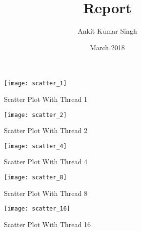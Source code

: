 \documentclass{article}
\title{Report}
\author{Ankit Kumar Singh}
\date{March 2018}
\begin{document}
\maketitle
\newpage
\begin{figure*}[!ht]
    \centering
    \texttt{[image: scatter\_1]}
    
    \caption{Scatter Plot With Thread 1}
    \label{fig:sc1}
\end{figure*}
\begin{figure*}[!ht]
    \centering
    \texttt{[image: scatter\_2]}
    \caption{Scatter Plot With Thread 2}
    \label{fig:sc2}
\end{figure*}
\begin{figure*}[!ht]
    \centering
    \texttt{[image: scatter\_4]}
    \caption{Scatter Plot With Thread 4}
    \label{fig:sc4}
\end{figure*}
\begin{figure*}[!ht]
    \centering
    \texttt{[image: scatter\_8]}
    \caption{Scatter Plot With Thread 8}
    \label{fig:sc8}
\end{figure*}
\begin{figure*}[!ht]
    \centering
    \texttt{[image: scatter\_16]}
    \caption{Scatter Plot With Thread 16}
    \label{fig:sc16}
\end{figure*}

\end{document}
